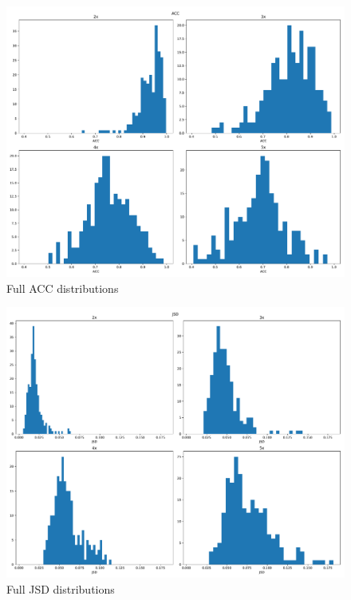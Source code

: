 \documentclass[11pt]{article}
\begin{document}
\begin{figure}[h]
  \centering
  \includegraphics[width=\linewidth]{../plots/ACC}
  \caption{Full ACC distributions}
  \label{fig:acc}
\end{figure}

\begin{figure}[h]
  \centering
  \includegraphics[width=\linewidth]{../plots/JSD}
  \caption{Full JSD distributions}
  \label{fig:jsd}
\end{figure}
\end{document}
